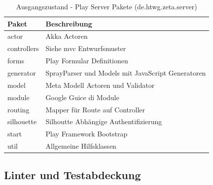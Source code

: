 \begin{table}[ht]
    \smallskip
    \centering
    \begin{tabular}{| l | l |}
    \hline
    \bf Paket & \bf Beschreibung \\ \hline
    actor & Akka Actoren \\ \hline
    controllers & Siehe \ac{mvc} Entwurfsmuster \\ \hline
    forms & Play Formular Definitionen \\ \hline
    generator & SprayParser und Models mit JavaScript Generatoren \\ \hline
    model & Meta Modell Actoren und Validator  \\ \hline
    module & Google Guice \ac{di} Module  \\ \hline
    routing & Mapper für Route auf Controller\\ \hline
    silhouette & Silhoutte Abhängige Authentifizierung \\ \hline
    start & Play Framework Bootstrap \\ \hline
    util & Allgemeine Hilfsklassen \\ \hline
    \end{tabular}
    \caption{Ausgangszustand - Play Server Pakete (de.htwg.zeta.server)}
    \label{tab:ZETA_NEW_PLAY_PACKAGES}
\end{table}

\subsection{Linter und Testabdeckung}

